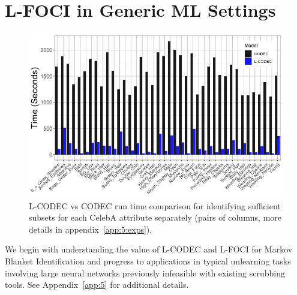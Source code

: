 \section{L-FOCI in Generic ML Settings}
\begin{figure}
    \centering
    \includegraphics[width=0.98\columnwidth,trim={0, 0, 0, 0},clip]{5_unlearn/figs/Speed_Hist.png}
    \caption[Speedups from L-CODEC randomization]{\label{fig:speed_hist} L-CODEC vs CODEC run time comparison for identifying sufficient subsets for each CelebA attribute separately (pairs of columns, more details in appendix~\ref{app:5:exps}).}
\end{figure}
We begin with understanding the value of L-CODEC and L-FOCI for Markov Blanket Identification and progress to applications
in typical unlearning tasks involving large neural networks previously infeasible with existing scrubbing tools.
See Appendix~\ref{app:5} for additional details.

